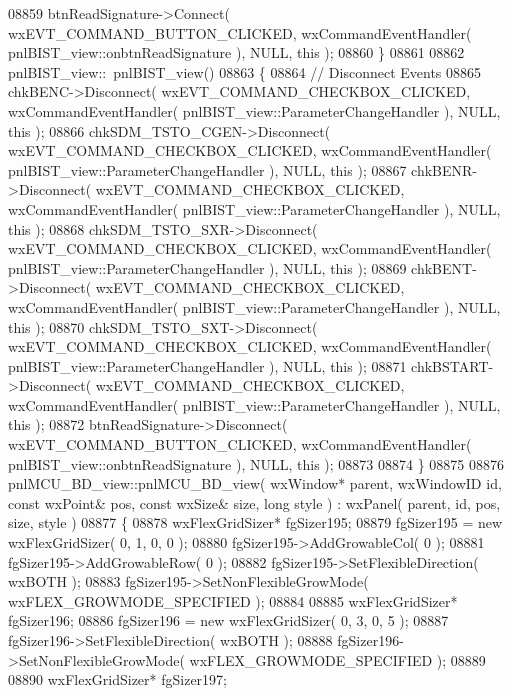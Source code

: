 \begin{DoxyCode}
08859     btnReadSignature->Connect( wxEVT\_COMMAND\_BUTTON\_CLICKED, wxCommandEventHandler( 
      pnlBIST_view::onbtnReadSignature ), NULL, \textcolor{keyword}{this} );
08860 \}
08861 
08862 pnlBIST_view::~pnlBIST_view()
08863 \{
08864     \textcolor{comment}{// Disconnect Events}
08865     chkBENC->Disconnect( wxEVT\_COMMAND\_CHECKBOX\_CLICKED, wxCommandEventHandler( 
      pnlBIST_view::ParameterChangeHandler ), NULL, \textcolor{keyword}{this} );
08866     chkSDM_TSTO_CGEN->Disconnect( wxEVT\_COMMAND\_CHECKBOX\_CLICKED, wxCommandEventHandler( 
      pnlBIST_view::ParameterChangeHandler ), NULL, \textcolor{keyword}{this} );
08867     chkBENR->Disconnect( wxEVT\_COMMAND\_CHECKBOX\_CLICKED, wxCommandEventHandler( 
      pnlBIST_view::ParameterChangeHandler ), NULL, \textcolor{keyword}{this} );
08868     chkSDM_TSTO_SXR->Disconnect( wxEVT\_COMMAND\_CHECKBOX\_CLICKED, wxCommandEventHandler( 
      pnlBIST_view::ParameterChangeHandler ), NULL, \textcolor{keyword}{this} );
08869     chkBENT->Disconnect( wxEVT\_COMMAND\_CHECKBOX\_CLICKED, wxCommandEventHandler( 
      pnlBIST_view::ParameterChangeHandler ), NULL, \textcolor{keyword}{this} );
08870     chkSDM_TSTO_SXT->Disconnect( wxEVT\_COMMAND\_CHECKBOX\_CLICKED, wxCommandEventHandler( 
      pnlBIST_view::ParameterChangeHandler ), NULL, \textcolor{keyword}{this} );
08871     chkBSTART->Disconnect( wxEVT\_COMMAND\_CHECKBOX\_CLICKED, wxCommandEventHandler( 
      pnlBIST_view::ParameterChangeHandler ), NULL, \textcolor{keyword}{this} );
08872     btnReadSignature->Disconnect( wxEVT\_COMMAND\_BUTTON\_CLICKED, wxCommandEventHandler( 
      pnlBIST_view::onbtnReadSignature ), NULL, \textcolor{keyword}{this} );
08873     
08874 \}
08875 
08876 pnlMCU_BD_view::pnlMCU_BD_view( wxWindow* parent, wxWindowID \textcolor{keywordtype}{id}, \textcolor{keyword}{const} wxPoint& pos, \textcolor{keyword}{const} wxSize& 
      size, \textcolor{keywordtype}{long} style ) : wxPanel( parent, id, pos, size, style )
08877 \{
08878     wxFlexGridSizer* fgSizer195;
08879     fgSizer195 = \textcolor{keyword}{new} wxFlexGridSizer( 0, 1, 0, 0 );
08880     fgSizer195->AddGrowableCol( 0 );
08881     fgSizer195->AddGrowableRow( 0 );
08882     fgSizer195->SetFlexibleDirection( wxBOTH );
08883     fgSizer195->SetNonFlexibleGrowMode( wxFLEX\_GROWMODE\_SPECIFIED );
08884     
08885     wxFlexGridSizer* fgSizer196;
08886     fgSizer196 = \textcolor{keyword}{new} wxFlexGridSizer( 0, 3, 0, 5 );
08887     fgSizer196->SetFlexibleDirection( wxBOTH );
08888     fgSizer196->SetNonFlexibleGrowMode( wxFLEX\_GROWMODE\_SPECIFIED );
08889     
08890     wxFlexGridSizer* fgSizer197;

\end{DoxyCode}
